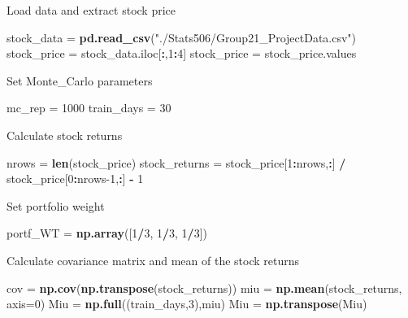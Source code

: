 \documentclass[]{book}
\newenvironment{Shaded}{\begin{snugshade}}{\end{snugshade}}
\newcommand{\DataTypeTok}[1]{\textcolor[rgb]{0.13,0.29,0.53}{#1}}
\newcommand{\DecValTok}[1]{\textcolor[rgb]{0.00,0.00,0.81}{#1}}
\newcommand{\KeywordTok}[1]{\textcolor[rgb]{0.13,0.29,0.53}{\textbf{#1}}}
\newcommand{\NormalTok}[1]{#1}
\newcommand{\OperatorTok}[1]{\textcolor[rgb]{0.81,0.36,0.00}{\textbf{#1}}}
\newcommand{\StringTok}[1]{\textcolor[rgb]{0.31,0.60,0.02}{#1}}
\begin{document}
Load data and extract stock price

\begin{Shaded}
\begin{Highlighting}[]
\NormalTok{stock_data =}\StringTok{ }\KeywordTok{pd.read_csv}\NormalTok{(}\StringTok{"./Stats506/Group21_ProjectData.csv"}\NormalTok{)}
\NormalTok{stock_price =}\StringTok{ }\NormalTok{stock_data.iloc[}\OperatorTok{:}\NormalTok{,}\DecValTok{1}\OperatorTok{:}\DecValTok{4}\NormalTok{]}
\NormalTok{stock_price =}\StringTok{ }\NormalTok{stock_price.values}
\end{Highlighting}
\end{Shaded}

Set Monte\_Carlo parameters

\begin{Shaded}
\begin{Highlighting}[]
\NormalTok{mc_rep =}\StringTok{ }\DecValTok{1000}
\NormalTok{train_days =}\StringTok{ }\DecValTok{30}
\end{Highlighting}
\end{Shaded}

Calculate stock returns

\begin{Shaded}
\begin{Highlighting}[]
\NormalTok{nrows =}\StringTok{ }\KeywordTok{len}\NormalTok{(stock_price)}
\NormalTok{stock_returns =}\StringTok{ }\NormalTok{stock_price[}\DecValTok{1}\OperatorTok{:}\NormalTok{nrows,}\OperatorTok{:}\NormalTok{] }\OperatorTok{/}\StringTok{ }\NormalTok{stock_price[}\DecValTok{0}\OperatorTok{:}\NormalTok{nrows}\DecValTok{-1}\NormalTok{,}\OperatorTok{:}\NormalTok{] }\OperatorTok{-}\StringTok{ }\DecValTok{1}
\end{Highlighting}
\end{Shaded}

Set portfolio weight

\begin{Shaded}
\begin{Highlighting}[]
\NormalTok{portf_WT =}\StringTok{ }\KeywordTok{np.array}\NormalTok{([}\DecValTok{1}\OperatorTok{/}\DecValTok{3}\NormalTok{, }\DecValTok{1}\OperatorTok{/}\DecValTok{3}\NormalTok{, }\DecValTok{1}\OperatorTok{/}\DecValTok{3}\NormalTok{])}
\end{Highlighting}
\end{Shaded}

Calculate covariance matrix and mean of the stock returns

\begin{Shaded}
\begin{Highlighting}[]
\NormalTok{cov =}\StringTok{ }\KeywordTok{np.cov}\NormalTok{(}\KeywordTok{np.transpose}\NormalTok{(stock_returns))}
\NormalTok{miu =}\StringTok{ }\KeywordTok{np.mean}\NormalTok{(stock_returns, }\DataTypeTok{axis=}\DecValTok{0}\NormalTok{)}
\NormalTok{Miu =}\StringTok{ }\KeywordTok{np.full}\NormalTok{((train_days,}\DecValTok{3}\NormalTok{),miu)}
\NormalTok{Miu =}\StringTok{ }\KeywordTok{np.transpose}\NormalTok{(Miu)}
\end{Highlighting}
\end{Shaded}
\end{document}
